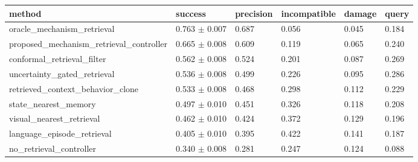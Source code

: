 \begin{tabular}{llllll}
\toprule
method & success & precision & incompatible & damage & query \\
\midrule
oracle\_mechanism\_retrieval & 0.763 $\pm$ 0.007 & 0.687 & 0.056 & 0.045 & 0.184 \\
proposed\_mechanism\_retrieval\_controller & 0.665 $\pm$ 0.008 & 0.609 & 0.119 & 0.065 & 0.240 \\
conformal\_retrieval\_filter & 0.562 $\pm$ 0.008 & 0.524 & 0.201 & 0.087 & 0.269 \\
uncertainty\_gated\_retrieval & 0.536 $\pm$ 0.008 & 0.499 & 0.226 & 0.095 & 0.286 \\
retrieved\_context\_behavior\_clone & 0.533 $\pm$ 0.008 & 0.468 & 0.298 & 0.112 & 0.229 \\
state\_nearest\_memory & 0.497 $\pm$ 0.010 & 0.451 & 0.326 & 0.118 & 0.208 \\
visual\_nearest\_retrieval & 0.462 $\pm$ 0.010 & 0.424 & 0.372 & 0.129 & 0.196 \\
language\_episode\_retrieval & 0.405 $\pm$ 0.010 & 0.395 & 0.422 & 0.141 & 0.187 \\
no\_retrieval\_controller & 0.340 $\pm$ 0.008 & 0.281 & 0.247 & 0.124 & 0.088 \\
\bottomrule
\end{tabular}
